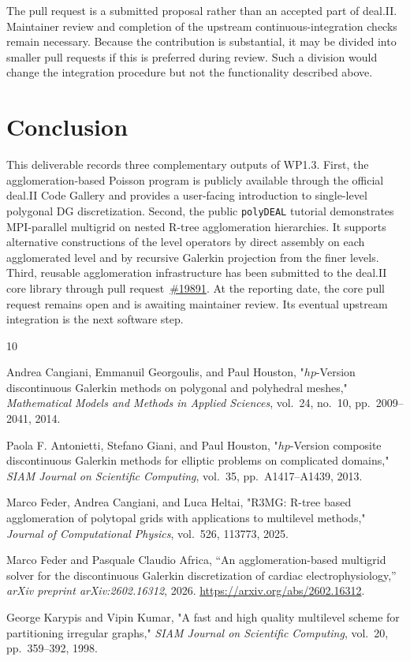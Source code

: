 \documentclass[a4paper,12pt]{article}
\begin{document}
The pull request is a submitted proposal rather than
an accepted part of deal.II. Maintainer review and completion of the upstream
continuous-integration checks remain necessary. Because the contribution is
substantial, it may be divided into smaller pull requests if this is preferred
during review. Such a division would change the integration procedure but not
the functionality described above.


\section{{Conclusion}}
\label{sec:conclusion}
This deliverable records three complementary outputs of WP1.3.
First, the agglo\-me\-ration-based Poisson program is publicly available
through the official deal.II Code Gallery and provides a user-facing
introduction to single-level polygonal DG discretization. Second, the
public \texttt{polyDEAL} tutorial demonstrates MPI-parallel multigrid
on nested R-tree agglomeration hierarchies. It supports alternative
constructions of the level operators by direct assembly on each
agglomerated level and by recursive Galerkin projection from the finer
levels. Third, reusable agglomeration infrastructure has been submitted
to the deal.II core library through pull request~\href{https://github.com/dealii/dealii/pull/19891}{\#19891}. At the reporting date, the core pull request remains open and is awaiting maintainer review. Its eventual upstream integration is the next software step.
\begin{thebibliography}{10}

Andrea Cangiani, Emmanuil Georgoulis, and Paul Houston,
"$hp$-Version discontinuous Galerkin methods on polygonal and polyhedral
meshes," \emph{Mathematical Models and Methods in Applied Sciences},
vol.~24, no.~10, pp.~2009--2041, 2014.

Paola F. Antonietti, Stefano Giani, and Paul Houston,
"$hp$-Version composite discontinuous Galerkin methods for elliptic problems
on complicated domains," \emph{SIAM Journal on Scientific Computing},
vol.~35, pp.~A1417--A1439, 2013.

Marco Feder, Andrea Cangiani, and Luca Heltai,
"R3MG: R-tree based agglomeration of polytopal grids with applications to
multilevel methods," \emph{Journal of Computational Physics}, vol.~526,
113773, 2025.

Marco Feder and Pasquale Claudio Africa,
``An agglomeration-based multigrid solver for the discontinuous Galerkin
discretization of cardiac electrophysiology,''
\emph{arXiv preprint arXiv:2602.16312}, 2026.
\url{https://arxiv.org/abs/2602.16312}.

George Karypis and Vipin Kumar,
"A fast and high quality multilevel scheme for partitioning irregular
graphs," \emph{SIAM Journal on Scientific Computing}, vol.~20,
pp.~359--392, 1998.

\end{thebibliography}

\label{MyLastPage}
\end{document}
